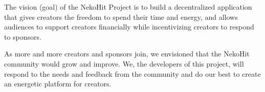The vision (goal) of the NekoHit Project is to build a decentralized
application that gives creators the freedom to spend their time and energy,
and allows audiences to support creators financially while incentivizing
creators to respond to sponsors.

As more and more creators and sponsors join, we envisioned that the NekoHit
community would grow and improve.
We, the developers of this project, will respond to the needs and feedback
from the community and do our best to create an energetic platform for creators.